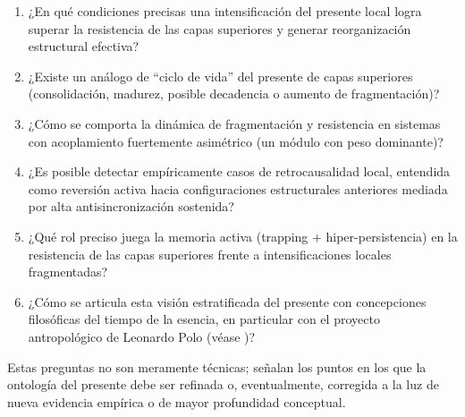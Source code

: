 \begin{enumerate}
    \item ¿En qué condiciones precisas una intensificación del presente local logra superar la resistencia de las capas superiores y generar reorganización estructural efectiva?
    
    \item ¿Existe un análogo de ``ciclo de vida'' del presente de capas superiores (consolidación, madurez, posible decadencia o aumento de fragmentación)?
    
    \item ¿Cómo se comporta la dinámica de fragmentación y resistencia en sistemas con acoplamiento fuertemente asimétrico (un módulo con peso dominante)?
    
    \item ¿Es posible detectar empíricamente casos de retrocausalidad local, entendida como reversión activa hacia configuraciones estructurales anteriores mediada por alta antisincronización sostenida?
    
    \item ¿Qué rol preciso juega la memoria activa (trapping + hiper-persistencia) en la resistencia de las capas superiores frente a intensificaciones locales fragmentadas?
    
    \item ¿Cómo se articula esta visión estratificada del presente con concepciones filosóficas del tiempo de la esencia, en particular con el proyecto antropológico de Leonardo Polo (véase \citep{polo_antropologia_trascendental,padilla_polo_dialogue_2026})?
\end{enumerate}

Estas preguntas no son meramente técnicas; señalan los puntos en los que la ontología del presente debe ser refinada o, eventualmente, corregida a la luz de nueva evidencia empírica o de mayor profundidad conceptual.